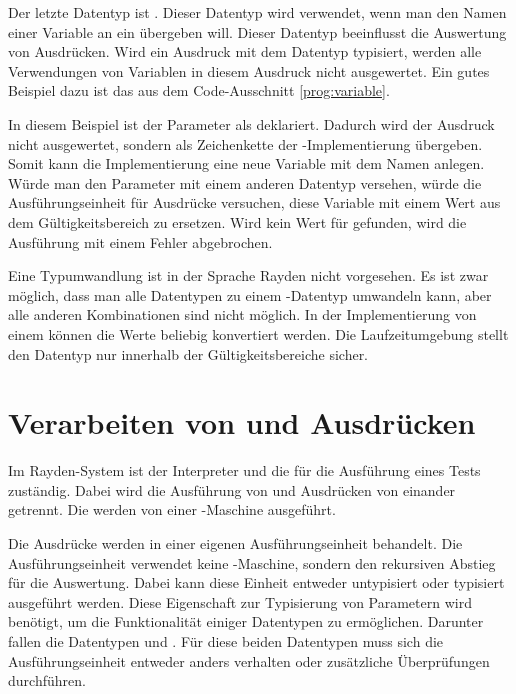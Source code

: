 \SuperPar
Der letzte Datentyp ist . Dieser Datentyp wird verwendet, wenn man den Namen einer Variable an ein  übergeben will. Dieser Datentyp beeinflusst die Auswertung von Ausdrücken. Wird ein Ausdruck mit dem Datentyp  typisiert, werden alle Verwendungen von Variablen in diesem Ausdruck nicht ausgewertet. Ein gutes Beispiel dazu ist das  aus dem Code-Ausschnitt \ref{prog:variable}.

\SuperPar
In diesem Beispiel ist der Parameter  als  deklariert. Dadurch wird der Ausdruck  nicht ausgewertet, sondern als Zeichenkette der -Implementierung übergeben. Somit kann die Implementierung eine neue Variable mit dem Namen  anlegen. Würde man den Parameter  mit einem anderen Datentyp versehen, würde die Ausführungseinheit für Ausdrücke versuchen, diese Variable mit einem Wert aus dem Gültigkeitsbereich zu ersetzen. Wird kein Wert für \enword{} gefunden, wird die Ausführung mit einem Fehler abgebrochen.

\SuperPar
Eine Typumwandlung ist in der Sprache Rayden nicht vorgesehen. Es ist zwar möglich, dass man alle Datentypen zu einem -Datentyp umwandeln kann, aber alle anderen Kombinationen sind nicht möglich. In der Implementierung von einem  können die Werte beliebig konvertiert werden. Die Laufzeitumgebung stellt den Datentyp nur innerhalb der Gültigkeitsbereiche sicher.

\section{Verarbeiten von  und Ausdrücken}

Im Rayden-System ist der Interpreter und die  für die Ausführung eines Tests zuständig. Dabei wird die Ausführung von  und Ausdrücken von einander getrennt. Die  werden von einer -Maschine ausgeführt. 

\SuperPar
Die Ausdrücke werden in einer eigenen Ausführungseinheit behandelt. Die Ausführungseinheit verwendet keine -Maschine, sondern den rekursiven Abstieg für die Auswertung. Dabei kann diese Einheit entweder untypisiert oder typisiert ausgeführt werden. Diese Eigenschaft zur Typisierung von Parametern wird benötigt, um die Funktionalität einiger Datentypen zu ermöglichen. Darunter fallen die Datentypen  und . Für diese beiden Datentypen muss sich die Ausführungseinheit entweder anders verhalten oder zusätzliche Überprüfungen durchführen. 

